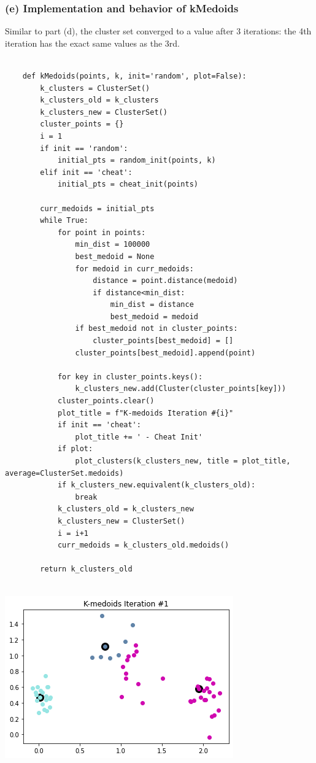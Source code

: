 \documentclass[11pt]{article}
\newcommand{\sol}[1]{{\bf{\color{magenta}{{Solution:}}}}}
\begin{document}
\subsubsection{(e) Implementation and behavior of kMedoids}
\sol x Similar to part (d), the cluster set converged to a value after 3 iterations: the 4th iteration has the exact same values as the 3rd.

\begin{verbatim}

    def kMedoids(points, k, init='random', plot=False):
        k_clusters = ClusterSet()
        k_clusters_old = k_clusters
        k_clusters_new = ClusterSet()
        cluster_points = {}
        i = 1
        if init == 'random':
            initial_pts = random_init(points, k)
        elif init == 'cheat':
            initial_pts = cheat_init(points)
        
        curr_medoids = initial_pts    
        while True:
            for point in points:
                min_dist = 100000
                best_medoid = None
                for medoid in curr_medoids:
                    distance = point.distance(medoid)
                    if distance<min_dist:
                        min_dist = distance
                        best_medoid = medoid
                if best_medoid not in cluster_points:
                    cluster_points[best_medoid] = []
                cluster_points[best_medoid].append(point)
            
            for key in cluster_points.keys(): 
                k_clusters_new.add(Cluster(cluster_points[key]))
            cluster_points.clear()
            plot_title = f"K-medoids Iteration #{i}"
            if init == 'cheat':
                plot_title += ' - Cheat Init'
            if plot:
                plot_clusters(k_clusters_new, title = plot_title, average=ClusterSet.medoids)
            if k_clusters_new.equivalent(k_clusters_old):
                break
            k_clusters_old = k_clusters_new
            k_clusters_new = ClusterSet()
            i = i+1
            curr_medoids = k_clusters_old.medoids()
    
        return k_clusters_old
    
\end{verbatim}

\begin{center}
    \includegraphics[scale=0.6]{2e-1.png}
\end{center}
\end{document}

